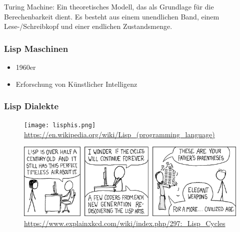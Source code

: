 \documentclass{beamer}
\begin{document}
\begin{frame}

\textmd{Turing Machine: Ein theoretisches Modell, das als Grundlage für die Berechenbarkeit dient. Es besteht aus einem unendlichen Band, einem Lese-/Schreibkopf und einer endlichen Zustandsmenge.}



\end{frame}

\begin{frame}
\frametitle{Lisp Maschinen}
	\begin{itemize}
            \item 1960er
            \item Erforschung von Künstlicher Intelligenz
	\end{itemize}
	
\end{frame}

\begin{frame}
\frametitle{Lisp Dialekte}
	\begin{figure}
	    \centering
	    \texttt{[image: lisphis.png]}
            \textmd{ \tiny \url{https://en.wikipedia.org/wiki/Lisp_(programming_language)}}
	\end{figure}
\end{frame}



\begin{frame}
	\begin{figure}
	    \centering
	    \includegraphics[width=1\linewidth]{bilder/lisp_cycles.png}
        \textmd{ \tiny \url{https://www.explainxkcd.com/wiki/index.php/297:_Lisp_Cycles}}
	\end{figure}
\end{frame}
\end{document}
